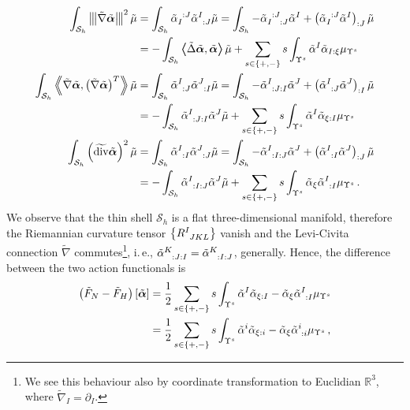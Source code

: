 \documentclass[a4paper,10pt]{scrartcl}
\newcommand{\surf}{\mathcal{S}}
\newcommand{\surfh}{\surf_{h}}
\newcommand{\R}{\mathbb{R}}
\newcommand{\alphab}{\bm{\alpha}}
\renewcommand{\div}{\operatorname{div}}
\newcommand{\talphab}{\tilde{\alphab}}
\newcommand{\talpha}{\tilde{\alpha}}
\newcommand{\tmu}{\tilde{\mu}}
\newcommand{\tF}{\tilde{F}}
\newcommand{\tnabla}{\tilde{\nabla}}
\newcommand{\tlaplace}{\tilde{\Delta}}
\newcommand{\tdiv}{\widetilde{\div}}
\newcommand{\tnorm}[1]{\left\Vert\mkern-1.9mu\left\vert #1 \right\vert\mkern-1.9mu\right\Vert}
\newcommand{\tscal}[1]{\left\langle\mkern-8mu\left\langle #1 \right\rangle\mkern-8mu\right\rangle}
\newcommand{\formComma}{\,\text{,}}
\newcommand{\formPeriod}{\,\text{.}}
\newcommand{\ie}{i.\,e.}%
\begin{document}
    \begin{align}
      \int_{\surfh} \tnorm{\tnabla\talphab}^{2} \tmu
          &= \int_{\surfh}\tensor{\talpha}{_{I}^{:J}}\tensor{\talpha}{^{I}_{:J}}\tmu
           = \int_{\surfh} -\tensor{\talpha}{_{I}^{:J}_{:J}}\talpha^{I} + \left( \tensor{\talpha}{_{I}^{:J}} \talpha^{I} \right)_{:J} \tmu \\
          &= -\int_{\surfh} \tscal{\tlaplace\talphab , \talphab} \tmu
             + \sum_{s\in\{+,-\}}s\int_{\Upsilon^{s}} \talpha^{I}\talpha_{I:\xi} \mu_{\Upsilon^{s}}\\
      \int_{\surfh} \tscal{\tnabla\talphab, \left( \tnabla\talphab \right)^{T}} \tmu
          &= \int_{\surfh} \tensor{\talpha}{^{I}_{:J}} \tensor{\talpha}{^{J}_{:I}} \tmu
           = \int_{\surfh} - \tensor{\talpha}{^{I}_{:J:I}}\talpha^{J} + \left( \tensor{\talpha}{^{I}_{:J}}\talpha^{J} \right)_{:I} \tmu \\
          &= -\int_{\surfh} \tensor{\talpha}{^{I}_{:J:I}}\talpha^{J} \tmu
             + \sum_{s\in\{+,-\}}s\int_{\Upsilon^{s}} \talpha^{I} \talpha_{\xi:I} \mu_{\Upsilon^{s}} \\
      \int_{\surfh}\left( \tdiv\talphab \right)^{2} \tmu
          &=  \int_{\surfh} \tensor{\talpha}{^{I}_{:I}} \tensor{\talpha}{^{J}_{:J}} \tmu
           = \int_{\surfh} -\tensor{\talpha}{^{I}_{:I:J}}\talpha^{J} + \left( \tensor{\talpha}{^{I}_{:I}} \talpha^{J} \right)_{:J} \tmu \\
          &= -\int_{\surfh} \tensor{\talpha}{^{I}_{:I:J}}\talpha^{J} \tmu
             + \sum_{s\in\{+,-\}}s\int_{\Upsilon^{s}} \talpha_{\xi}\tensor{\talpha}{^{I}_{:I}}  \mu_{\Upsilon^{s}} \formPeriod
    \end{align}
    We observe that the thin shell \( \surfh \) is a flat three-dimensional manifold,
    therefore the Riemannian curvature tensor \( \left\{ \tensor{R}{^{I}_{JKL}} \right\} \) vanish and the Levi-Civita connection \( \tnabla \) 
    commutes\footnote{We see this behaviour also by coordinate transformation to Euclidian \( \R^{3} \), where \( \tnabla_{I}=\partial_{I} \).}, 
    \ie, \( \tensor{\talpha}{^{K}_{:J:I}} = \tensor{\talpha}{^{K}_{:I:J}} \), generally.
    Hence, the difference between the two action functionals is
    \begin{align}
      \left( \tF_{N} - \tF_{H} \right)\left[ \talphab \right]
          &= \frac{1}{2} \sum_{s\in\{+,-\}}s\int_{\Upsilon^{s}} \talpha^{I} \talpha_{\xi:I} - \talpha_{\xi}\tensor{\talpha}{^{I}_{:I}} \mu_{\Upsilon^{s}}\\
          &= \frac{1}{2} \sum_{s\in\{+,-\}}s\int_{\Upsilon^{s}} \talpha^{i} \talpha_{\xi:i} - \talpha_{\xi}\tensor{\talpha}{^{i}_{:i}} \mu_{\Upsilon^{s}}\formComma
    \end{align}
\end{document}
